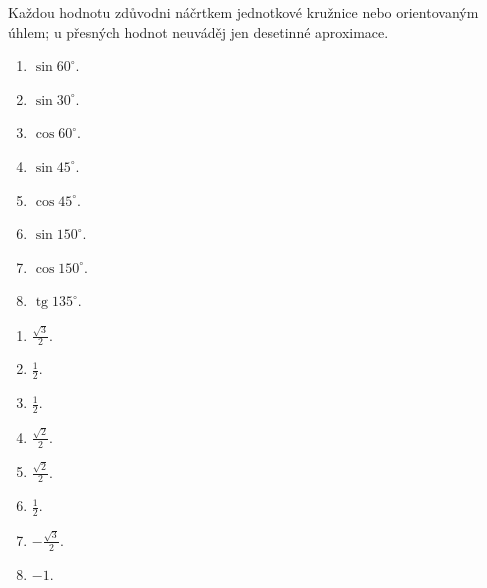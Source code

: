 \documentclass[11pt,a4paper]{article}
\begin{document}
Každou hodnotu zdůvodni náčrtkem jednotkové kružnice nebo orientovaným úhlem; u přesných hodnot neuváděj jen desetinné aproximace.
\begin{zadaniReseniBox}[title={Domácí úkol}]
\begin{enumerate}[label=\alph*)]
\item $\sin60^\circ$.
\item $\sin30^\circ$.
\item $\cos60^\circ$.
\item $\sin45^\circ$.
\item $\cos45^\circ$.
\item $\sin150^\circ$.
\item $\cos150^\circ$.
\item $\operatorname{tg}135^\circ$.
\end{enumerate}
\tcblower
\begin{enumerate}[label=\alph*)]
\item $\frac{\sqrt3}{2}$.
\item $\frac{1}{2}$.
\item $\frac{1}{2}$.
\item $\frac{\sqrt2}{2}$.
\item $\frac{\sqrt2}{2}$.
\item $\frac{1}{2}$.
\item $-\frac{\sqrt3}{2}$.
\item $-1$.
\end{enumerate}
\end{zadaniReseniBox}
\end{document}
